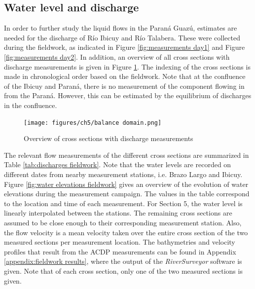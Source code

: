 \subsection{Water level and discharge}
In order to further study the liquid flows in the Paraná Guazú, estimates are needed for the discharge of Río Ibicuy and Río Talabera. These were collected during the fieldwork, as indicated in Figure \ref{fig:measurements day1} and Figure \ref{fig:measurements day2}. In addition, an overview of all cross sections with discharge measurements is given in Figure \ref{fig:cross section domain}. The indexing of the cross sections is made in chronological order based on the fieldwork. Note that at the confluence of the Ibicuy and Paraná, there is no measurement of the component flowing in from the Paraná. However, this can be estimated by the equilibrium of discharges in the confluence. 

\begin{figure}[H]
    \centering
    \texttt{[image: figures/ch5/balance domain.png]}
    \caption{Overview of cross sections with discharge measurements}
    \label{fig:cross section domain}
\end{figure}

The relevant flow measurements of the different cross sections are summarized in Table \ref{tab:discharges fieldwork}. Note that the water levels are recorded on different dates from nearby measurement stations, i.e. Brazo Largo and Ibicuy. Figure \ref{fig:water elevations fieldwork} gives an overview of the evolution of water elevations during the measurement campaign. The values in the table correspond to the location and time of each measurement. For Section 5, the water level is linearly interpolated between the stations. The remaining cross sections are assumed to be close enough to their corresponding measurement station.  Also, the flow velocity is a mean velocity taken over the entire cross section of the two measured sections per measurement location. The bathymetries and velocity profiles that result from the ACDP measurements can be found in Appendix \ref{appendix:fieldwork results}, where the output of the \textit{RiverSurveyor} software is given. Note that of each cross section, only one of the two measured sections is given. 

